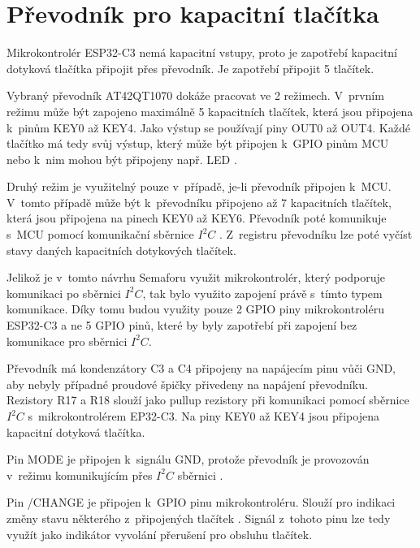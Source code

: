 
\section{Převodník pro kapacitní tlačítka}
Mikrokontrolér ESP32-C3 nemá kapacitní vstupy, proto je zapotřebí kapacitní dotyková tlačítka připojit přes převodník. Je zapotřebí připojit 
5 tlačítek. 

Vybraný převodník AT42QT1070 dokáže pracovat ve 2 režimech. V~prvním režimu může být zapojeno maximálně 5 kapacitních tlačítek, která jsou připojena
k~pinům KEY0 až KEY4. Jako výstup se používají piny OUT0 až OUT4. Každé tlačítko má tedy svůj výstup, který může být připojen k~GPIO pinům MCU 
nebo k~nim mohou být připojeny např. LED \cite{conv_cap_but_AT42QT1070_dtsh}. 

Druhý režim je využitelný pouze v~případě, je-li převodník připojen k~MCU. V~tomto případě může být k~převodníku připojeno až 7 kapacitních tlačítek, 
která jsou připojena na pinech KEY0 až KEY6. Převodník poté komunikuje s~MCU pomocí komunikační sběrnice $I^2C$ \cite{conv_cap_but_AT42QT1070_dtsh}. 
Z~registru převodníku lze poté vyčíst stavy daných kapacitních dotykových tlačítek. 

Jelikož je v~tomto návrhu Semaforu využit mikrokontrolér, který podporuje komunikaci po sběrnici $I^2C$, tak bylo využito zapojení právě s~tímto typem 
komunikace. Díky tomu budou využity pouze 2 GPIO piny mikrokontroléru ESP32-C3 a ne 5 GPIO pinů, které by byly zapotřebí při zapojení bez komunikace pro
sběrnici $I^2C$.

Převodník má kondenzátory C3 a C4 připojeny na napájecím pinu vůči GND, aby nebyly případné proudové špičky přivedeny na napájení převodníku. Rezistory
R17 a R18 slouží jako pullup rezistory při komunikaci pomocí sběrnice $I^2C$ s~mikrokontrolérem EP32-C3. Na piny KEY0 až KEY4 jsou připojena kapacitní 
dotyková tlačítka.  

Pin MODE je připojen k~signálu GND, protože převodník je provozován v~režimu komunikujícím přes $I^2C$ sběrnici \cite{conv_cap_but_AT42QT1070_dtsh}.

Pin /CHANGE je připojen k~GPIO pinu mikrokontroléru. Slouží pro indikaci změny stavu některého z~připojených tlačítek \cite{conv_cap_but_AT42QT1070_dtsh}. 
Signál z~tohoto pinu lze tedy využít jako indikátor vyvolání přerušení pro obsluhu tlačítek. 

